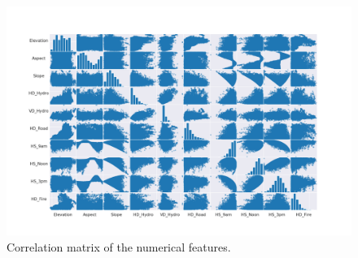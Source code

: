 \begin{figure}
\centering
\includegraphics[width=\textwidth]{./TeX_files/img/fullcorrmatrix.png}
\caption{Correlation matrix of the numerical features.}
\label{fig:fullcorrmatrix}
\end{figure}